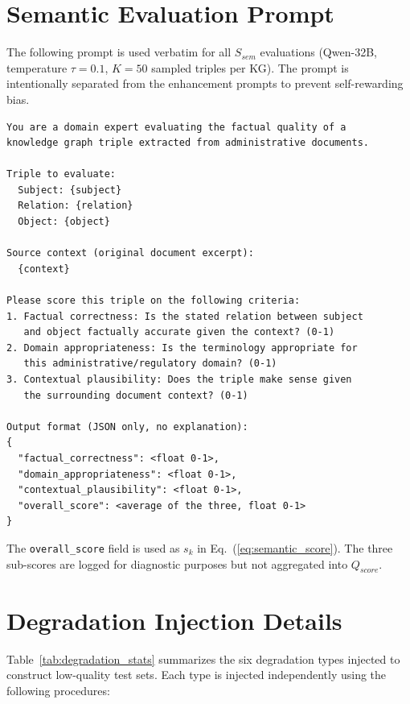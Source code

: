 \begin{appendices}

\section{Semantic Evaluation Prompt}
\label{appendix:sem_prompt}

The following prompt is used verbatim for all $S_{sem}$ evaluations (Qwen-32B, temperature $\tau=0.1$, $K=50$ sampled triples per KG). The prompt is intentionally separated from the enhancement prompts to prevent self-rewarding bias.

\begin{verbatim}
You are a domain expert evaluating the factual quality of a
knowledge graph triple extracted from administrative documents.

Triple to evaluate:
  Subject: {subject}
  Relation: {relation}
  Object: {object}

Source context (original document excerpt):
  {context}

Please score this triple on the following criteria:
1. Factual correctness: Is the stated relation between subject
   and object factually accurate given the context? (0-1)
2. Domain appropriateness: Is the terminology appropriate for
   this administrative/regulatory domain? (0-1)
3. Contextual plausibility: Does the triple make sense given
   the surrounding document context? (0-1)

Output format (JSON only, no explanation):
{
  "factual_correctness": <float 0-1>,
  "domain_appropriateness": <float 0-1>,
  "contextual_plausibility": <float 0-1>,
  "overall_score": <average of the three, float 0-1>
}
\end{verbatim}

The \texttt{overall\_score} field is used as $s_k$ in Eq.~(\ref{eq:semantic_score}). The three sub-scores are logged for diagnostic purposes but not aggregated into $Q_{score}$.

\section{Degradation Injection Details}
\label{appendix:degradation}

Table~\ref{tab:degradation_stats} summarizes the six degradation types injected to construct low-quality test sets. Each type is injected independently using the following procedures:


\end{appendices}
